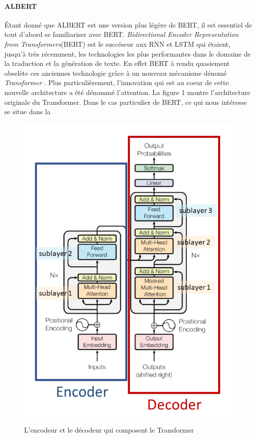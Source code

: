 \documentclass[11pt,a4paper, french]{article}
\begin{document}
\paragraph{ALBERT} Étant donné que ALBERT est une version plus légère de BERT, il est essentiel de tout d'abord se familiariser avec BERT. \textit{Bidirectional Encoder Representation from Transformers}(BERT) est le succéseur aux RNN et LSTM qui étaient, jusqu'à très récemment, les technologies les plus performantes dans le domaine de la traduction et la génération de texte. En effet BERT à rendu quasiement obselète ces anciennes technologie grâce à un nouveau mécanisme dénomé \textit{Transformer} \cite{attention}. Plus particulièrement, l'innovation qui est au coeur de cette nouvelle architecture a été dénommé l'attention. La figure 1 montre l'architecture originale du Transformer. Dans le cas particulier de BERT, ce qui nous intéresse se situe dans la 
\begin{figure}
	\includegraphics[width=\linewidth]{transformer.png}
	\caption{L'encodeur et le décodeur qui composent le Transformer}

\end{figure} 
\end{document}
